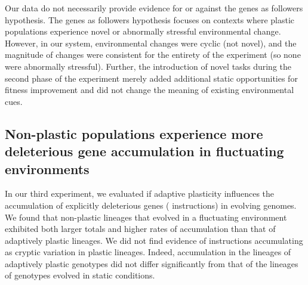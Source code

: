 Our data do not necessarily provide evidence for or against the genes as followers hypothesis.
The genes as followers hypothesis focuses on contexts where plastic populations experience novel or abnormally stressful environmental change.
However, in our system, environmental changes were cyclic (not novel), and the magnitude of changes were consistent for the entirety of the experiment (so none were abnormally stressful).
Further, the introduction of novel tasks during the second phase of the experiment merely added additional static opportunities for fitness improvement and did not change the meaning of existing environmental cues. %

\vspace{0.25cm}
\subsection{Non-plastic populations experience more deleterious gene accumulation in fluctuating environments}

In our third experiment, we evaluated if adaptive plasticity influences the accumulation of explicitly deleterious genes ( instructions) in evolving genomes.
We found that non-plastic lineages that evolved in a fluctuating environment exhibited both larger totals and higher rates of  accumulation than that of adaptively plastic lineages.
We did not find evidence of  instructions accumulating as cryptic variation in plastic lineages.
Indeed,  accumulation in the lineages of adaptively plastic genotypes did not differ significantly from that of the lineages of genotypes evolved in static conditions.

